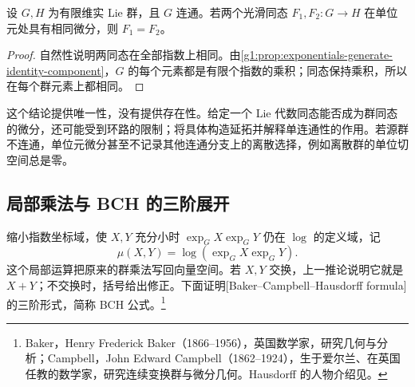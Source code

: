 \begin{corollary}\label{g1:cor:lie-homomorphism-uniqueness}
	设 \(G,H\) 为有限维实 Lie 群，且 \(G\) 连通。若两个光滑同态 \(F_1,F_2:G\to H\) 在单位元处具有相同微分，则 \(F_1=F_2\)。
\end{corollary}
\begin{proof}
	自然性说明两同态在全部指数上相同。由\cref{g1:prop:exponentials-generate-identity-component}，\(G\) 的每个元素都是有限个指数的乘积；同态保持乘积，所以在每个群元素上都相同。
\end{proof}

这个结论提供唯一性，没有提供存在性。给定一个 Lie 代数同态能否成为群同态的微分，还可能受到环路的限制；将具体构造延拓并解释单连通性的作用。若源群不连通，单位元微分甚至不记录其他连通分支上的离散选择，例如离散群的单位切空间总是零。

\subsection{局部乘法与 BCH 的三阶展开}
\label{g1:subsec:1602:04}

缩小指数坐标域，使 \(X,Y\) 充分小时 \(\exp_GX\exp_GY\) 仍在 \(\log\) 的定义域，记
\[
	\mu(X,Y)=\log(\exp_GX\exp_GY).
\]
这个局部运算把原来的群乘法写回向量空间。若 \(X,Y\) 交换，上一推论说明它就是 \(X+Y\)；不交换时，括号给出修正。下面证明[Baker--Campbell--Hausdorff formula]的三阶形式，简称 BCH 公式。\footnote{Baker，Henry Frederick Baker（1866--1956），英国数学家，研究几何与分析；Campbell，John Edward Campbell（1862--1924），生于爱尔兰、在英国任教的数学家，研究连续变换群与微分几何。Hausdorff 的人物介绍见。}

